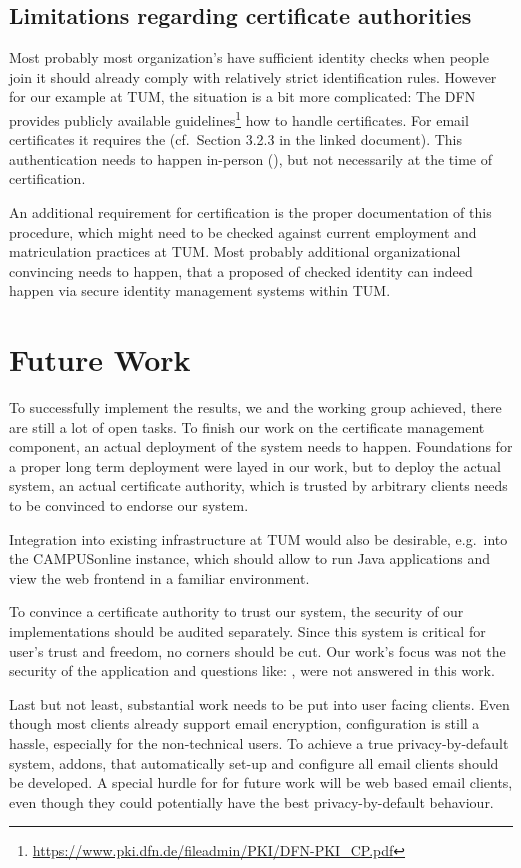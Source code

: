 \subsection*{Limitations regarding certificate authorities}
Most probably most organization's have sufficient identity checks when people join it should already comply with
relatively strict identification rules.
However for our example at TUM, the situation is a bit more complicated:
The DFN provides publicly available guidelines\footnote{\url{https://www.pki.dfn.de/fileadmin/PKI/DFN-PKI_CP.pdf}} how
to handle certificates.
For email certificates it requires the  (cf.\ Section 3.2.3 in the linked
document).
This authentication needs to happen in-person (), but not necessarily at the time of
certification.

An additional requirement for certification is the proper documentation of this procedure, which might need to be
checked against current employment and matriculation practices at TUM\@.
Most probably additional organizational convincing needs to happen, that a proposed  of checked identity
can indeed happen via secure identity management systems within TUM\@.

\section*{Future Work}
To successfully implement the results, we and the working group  achieved, there are still a lot of
open tasks.
To finish our work on the certificate management component, an actual deployment of the system needs to happen.
Foundations for a proper long term deployment were layed in our work, but to deploy the actual system,
an actual certificate authority, which is trusted by arbitrary clients needs to be convinced to endorse our system.

Integration into existing infrastructure at TUM would also be desirable, e.g.\ into the CAMPUSonline instance, which
should allow to run Java applications and view the web frontend in a familiar environment.

To convince a certificate authority to trust our system, the security of our implementations should be audited
separately.
Since this system is critical for user's trust and freedom, no corners should be cut.
Our work's focus was not the security of the application and questions like: , were not answered in this work.

Last but not least, substantial work needs to be put into user facing clients.
Even though most clients already support email encryption, configuration is still a hassle, especially for the
non-technical users.
To achieve a true privacy-by-default system, addons, that automatically set-up and configure all email clients should be
developed.
A special hurdle for for future work will be web based email clients, even though they could potentially have the best
privacy-by-default behaviour.
